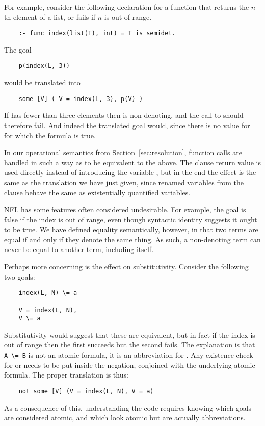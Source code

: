 For example, consider the following declaration
for a function that returns the $n$th element of a list,
or fails if $n$ is out of range.
\begin{verbatim}
    :- func index(list(T), int) = T is semidet.
\end{verbatim}
The goal
\begin{verbatim}
    p(index(L, 3))
\end{verbatim}
would be translated into
\begin{verbatim}
    some [V] ( V = index(L, 3), p(V) )
\end{verbatim}
If  has fewer than three elements
then  is non-denoting,
and the call to  should therefore fail.
And indeed the translated goal would,
since there is no value for 
for which the formula is true.

In our operational semantics
from Section~\ref{sec:resolution},
function calls are handled
in such a way as to be equivalent to the above.
The clause return value is used directly
instead of introducing the variable ,
but in the end the effect is the same as
the translation we have just given,
since renamed variables from the clause
behave the same as existentially quantified variables.

NFL has some features often considered undesirable.
For example, the goal 
is false if the index is out of range,
even though syntactic identity suggests it ought to be true.
We have defined equality semantically, however,
in that two terms are equal if and only if they denote the same thing.
As such,
a non-denoting term can never be equal to another term,
including itself.

Perhaps more concerning is the effect on substitutivity.
Consider the following two goals:
\begin{verbatim}
    index(L, N) \= a

    V = index(L, N),
    V \= a
\end{verbatim}
Substitutivity would suggest that these are equivalent,
but in fact if the index is out of range
then the first succeeds but the second fails.
The explanation is that \verb#A \= B# is not an atomic formula,
it is an abbreviation for .
Any existence check for  or 
needs to be put inside the negation,
conjoined with the underlying atomic formula.
The proper translation is thus:
\begin{verbatim}
    not some [V] (V = index(L, N), V = a)
\end{verbatim}
As a consequence of this,
understanding the code requires knowing which goals are considered atomic,
and which look atomic but are actually abbreviations.


